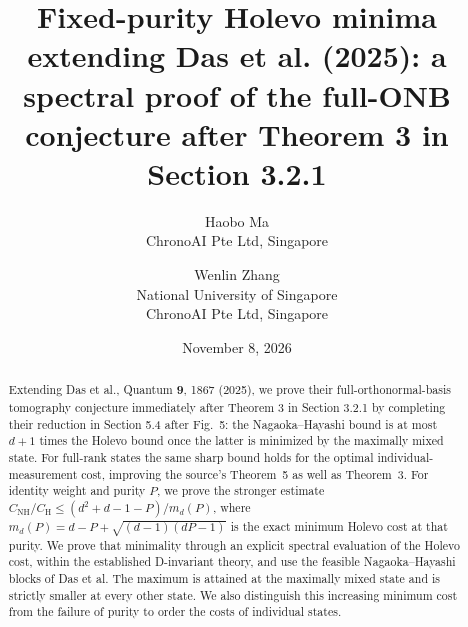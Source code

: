 \documentclass[11pt]{article}
\title{Fixed-purity Holevo minima extending Das et al. (2025): a spectral proof of the full-ONB conjecture after Theorem 3 in Section 3.2.1}
\author{Haobo Ma\\\small ChronoAI Pte Ltd, Singapore\and
Wenlin Zhang\\\small National University of Singapore\\\small ChronoAI Pte Ltd, Singapore}
\date{November 8, 2026}
\newcommand{\CH}{C_{\mathrm H}}
\newcommand{\CN}{C_{\mathrm{NH}}}
\begin{document}
\maketitle
\begin{abstract}
Extending Das et al., Quantum \textbf{9}, 1867 (2025), we prove their
full-orthonormal-basis tomography conjecture immediately after Theorem 3
in Section 3.2.1 by completing their reduction in Section 5.4 after Fig.~5:
the Nagaoka--Hayashi bound is at most $d+1$ times the Holevo bound once
the latter is minimized by the maximally mixed state.
For full-rank states the same sharp bound holds for the optimal
individual-measurement cost, improving the source's Theorem~5 as well as Theorem~3.
For identity weight and purity $P$, we prove the stronger estimate
$\CN/\CH\leq(d^2+d-1-P)/m_d(P)$, where
$m_d(P)=d-P+\sqrt{(d-1)(dP-1)}$ is the exact minimum Holevo cost at that purity.
We prove that minimality through an explicit spectral evaluation of the
Holevo cost, within the established D-invariant theory, and use the
feasible Nagaoka--Hayashi blocks of Das et al. The maximum is attained
at the maximally mixed state and is strictly smaller at every other state.
We also distinguish this increasing minimum cost from the failure of purity
to order the costs of individual states.
\end{abstract}
\end{document}
